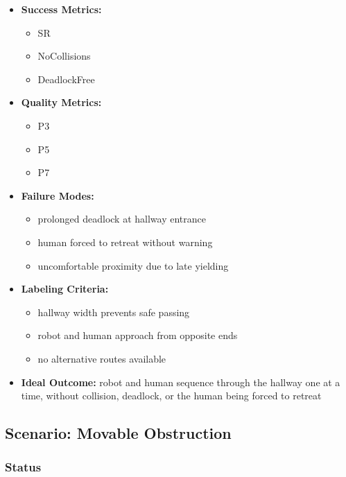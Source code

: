 \documentclass[utf8]{frontiers_suppmat} %
\providecommand{\tightlist}{%
  \setlength{\itemsep}{0pt}\setlength{\parskip}{0pt}}
\begin{document}
\begin{itemize}
\tightlist
\item
  \textbf{Success Metrics:}

  \begin{itemize}
  \tightlist
  \item
    SR
  \item
    NoCollisions
  \item
    DeadlockFree
  \end{itemize}
\item
  \textbf{Quality Metrics:}

  \begin{itemize}
  \tightlist
  \item
    P3
  \item
    P5
  \item
    P7
  \end{itemize}
\item
  \textbf{Failure Modes:}

  \begin{itemize}
  \tightlist
  \item
    prolonged deadlock at hallway entrance
  \item
    human forced to retreat without warning
  \item
    uncomfortable proximity due to late yielding
  \end{itemize}
\item
  \textbf{Labeling Criteria:}

  \begin{itemize}
  \tightlist
  \item
    hallway width prevents safe passing
  \item
    robot and human approach from opposite ends
  \item
    no alternative routes available
  \end{itemize}
\item
  \textbf{Ideal Outcome:} robot and human sequence through the hallway
  one at a time, without collision, deadlock, or the human being forced
  to retreat
\end{itemize}


\subsection{Scenario: Movable
Obstruction}\label{scenario-movable-obstruction}

\subsubsection{Status}\label{status}
\end{document}
